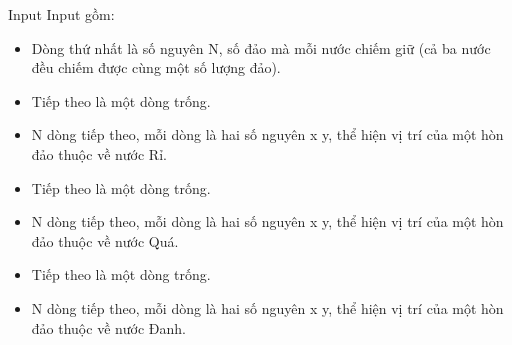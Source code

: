 Input
Input gồm:  
\begin{itemize}
	\item     Dòng thứ nhất là số nguyên N, số đảo mà mỗi nước chiếm giữ (cả ba nước đều chiếm được cùng một số lượng đảo).   
	\item     Tiếp theo là một dòng trống.   
	\item     N dòng tiếp theo, mỗi dòng là hai số nguyên x y, thể hiện vị trí của một hòn đảo thuộc về nước Rỉ.   
	\item     Tiếp theo là một dòng trống.   
	\item     N dòng tiếp theo, mỗi dòng là hai số nguyên x y, thể hiện vị trí của một hòn đảo thuộc về nước Quá.   
	\item     Tiếp theo là một dòng trống.   
	\item     N dòng tiếp theo, mỗi dòng là hai số nguyên x y, thể hiện vị trí của một hòn đảo thuộc về nước Đanh.   
\end{itemize}